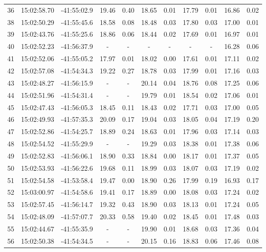 \begin{longtable}{ccccccccccc}
 36 & 15:02:58.70 & -41:55:02.9 & 19.46 & 0.40 & 18.65 & 0.01 & 17.79 & 0.01 & 16.86 & 0.02\\
 38 & 15:02:50.29 & -41:55:45.6 & 18.58 & 0.08 & 18.48 & 0.03 & 17.80 & 0.03 & 17.00 & 0.01\\
 39 & 15:02:43.76 & -41:55:25.6 & 18.86 & 0.06 & 18.44 & 0.02 & 17.69 & 0.01 & 16.97 & 0.01\\
 40 & 15:02:52.23 & -41:56:37.9 & - & - & - & - & - & - & 16.28 & 0.06\\
 41 & 15:02:52.06 & -41:55:05.2 & 17.97 & 0.01 & 18.02 & 0.00 & 17.61 & 0.01 & 17.11 & 0.02\\
 42 & 15:02:57.08 & -41:54:34.3 & 19.22 & 0.27 & 18.78 & 0.03 & 17.99 & 0.01 & 17.16 & 0.03\\
 43 & 15:02:48.27 & -41:56:15.9 & - & - & 20.14 & 0.04 & 18.76 & 0.08 & 17.25 & 0.06\\
 44 & 15:02:51.96 & -41:54:31.4 & - & - & 19.79 & 0.01 & 18.54 & 0.02 & 17.06 & 0.01\\
 45 & 15:02:47.43 & -41:56:05.3 & 18.45 & 0.11 & 18.43 & 0.02 & 17.71 & 0.03 & 17.00 & 0.05\\
 46 & 15:02:49.93 & -41:57:35.3 & 20.09 & 0.17 & 19.04 & 0.03 & 18.05 & 0.04 & 17.19 & 0.20\\
 47 & 15:02:52.86 & -41:54:25.7 & 18.89 & 0.24 & 18.63 & 0.01 & 17.96 & 0.03 & 17.14 & 0.03\\
 48 & 15:02:54.52 & -41:55:29.9 & - & - & 19.29 & 0.03 & 18.38 & 0.01 & 17.38 & 0.06\\
 49 & 15:02:52.83 & -41:56:06.1 & 18.90 & 0.33 & 18.84 & 0.00 & 18.17 & 0.01 & 17.37 & 0.05\\
 50 & 15:02:53.93 & -41:56:22.6 & 19.68 & 0.11 & 18.99 & 0.03 & 18.07 & 0.03 & 17.19 & 0.02\\
 51 & 15:02:54.58 & -41:53:58.4 & 19.47 & 0.00 & 18.90 & 0.26 & 17.99 & 0.19 & 16.93 & 0.17\\
 52 & 15:03:00.97 & -41:54:58.6 & 19.41 & 0.17 & 18.89 & 0.00 & 18.08 & 0.03 & 17.24 & 0.02\\
 53 & 15:02:57.45 & -41:56:14.7 & 19.32 & 0.43 & 18.90 & 0.03 & 18.13 & 0.01 & 17.24 & 0.05\\
 54 & 15:02:48.09 & -41:57:07.7 & 20.33 & 0.58 & 19.40 & 0.02 & 18.45 & 0.01 & 17.48 & 0.03\\
 55 & 15:02:44.67 & -41:55:35.9 & - & - & 19.90 & 0.01 & 18.68 & 0.03 & 17.36 & 0.04\\
 56 & 15:02:50.38 & -41:54:34.5 & - & - & 20.15 & 0.16 & 18.83 & 0.06 & 17.46 & 0.08\\

\end{longtable}
